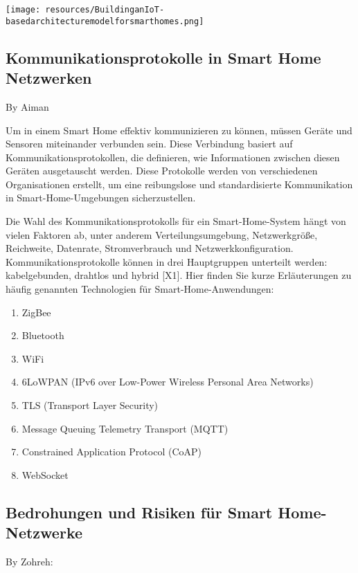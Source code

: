 \texttt{[image: resources/BuildinganIoT-basedarchitecturemodelforsmarthomes.png]}

\subsection{Kommunikationsprotokolle in Smart Home Netzwerken}
By Aiman

Um in einem Smart Home effektiv kommunizieren zu können, müssen Geräte und Sensoren miteinander verbunden sein. Diese Verbindung basiert auf Kommunikationsprotokollen, die definieren, wie Informationen zwischen diesen Geräten ausgetauscht werden. Diese Protokolle werden von verschiedenen Organisationen erstellt, um eine reibungslose und standardisierte Kommunikation in Smart-Home-Umgebungen sicherzustellen.


Die Wahl des Kommunikationsprotokolls für ein Smart-Home-System hängt von vielen Faktoren ab, unter anderem Verteilungsumgebung, Netzwerkgröße, Reichweite, Datenrate, Stromverbrauch und Netzwerkkonfiguration. Kommunikationsprotokolle können in drei Hauptgruppen unterteilt werden: kabelgebunden, drahtlos und hybrid [X1]. Hier finden Sie kurze Erläuterungen zu häufig genannten Technologien für Smart-Home-Anwendungen:
\begin{enumerate}
    \item ZigBee 
    \item Bluetooth
    \item WiFi 
      \item 6LoWPAN (IPv6 over Low-Power Wireless Personal Area Networks)
          \item TLS (Transport Layer Security)
    \item Message Queuing Telemetry Transport (MQTT)
    \item Constrained Application Protocol (CoAP) 
    \item WebSocket

\end{enumerate}
\newpage
\subsection{Bedrohungen und Risiken für Smart Home-Netzwerke}

By Zohreh:

